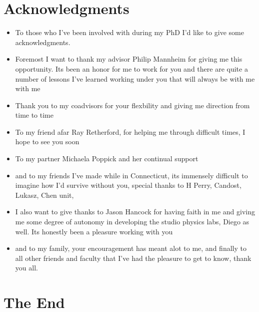 \documentclass[10pt,letterpaper]{article}
\numberwithin{equation}{section}
\begin{document}

\section{Acknowledgments}
\begin{itemize}
	\item To those who I've been involved with during my PhD I'd like to give some acknowledgments.
	\item Foremost I want to thank my advisor Philip Mannheim for giving me this opportunity. Its been an honor for me to work for you and there are quite a number of lessons I've learned working under you that will always be with me with me
	\item Thank you to my coadvisors for your flexbility and giving me direction from time to time
	\item To my friend afar Ray Retherford, for helping me through difficult times, I hope to see you soon
	\item To my partner Michaela Poppick and her continual support
	\item and to my friends I've made while in Connecticut, its immensely difficult to imagine how I'd survive without you, special thanks to H Perry, Candost, Lukasz, Chen unit,
	\item I also want to give thanks to Jason Hancock for having faith in me and giving me some degree of autonomy in developing the studio physics labs, Diego as well. Its honestly been a pleasure working with you
	\item and to my family, your encouragement has meant alot to me, and finally to all other friends and faculty that I've had the pleasure to get to know, thank you all. 
\end{itemize}


\section{The End}

\end{document}
